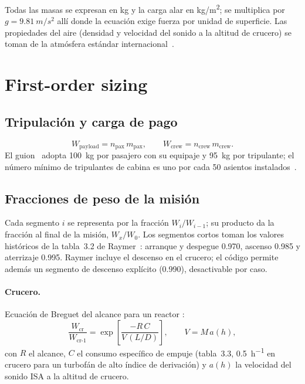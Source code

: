 \documentclass[11pt,a4paper]{article}
\newcommand{\WO}{W_0}
\begin{document}
Todas las masas se expresan en \si{kg} y la carga alar en \si{kg/m^2}; se
multiplica por $g=\SI{9.81}{m/s^2}$ allí donde la ecuación exige fuerza por
unidad de superficie. Las propiedades del aire (densidad y velocidad del
sonido a la altitud de crucero) se toman de la atmósfera estándar
internacional~\cite{isa}.

\section{First-order sizing}

\subsection{Tripulación y carga de pago}
\begin{equation}
  W_\text{payload} = n_\text{pax}\, m_\text{pax}, \qquad
  W_\text{crew} = n_\text{crew}\, m_\text{crew}.
\end{equation}
El guion~\cite{guion} adopta \SI{100}{kg} por pasajero con su equipaje y
\SI{95}{kg} por tripulante; el número mínimo de tripulantes de cabina es uno
por cada 50 asientos instalados~\cite{airops}.

\subsection{Fracciones de peso de la misión}
Cada segmento $i$ se representa por la fracción $W_i/W_{i-1}$; su producto da
la fracción al final de la misión, $W_x/\WO$. Los segmentos cortos toman los
valores históricos de la tabla~3.2 de Raymer~\cite{raymer6}: arranque y
despegue \num{0.970}, ascenso \num{0.985} y aterrizaje \num{0.995}. Raymer
incluye el descenso en el crucero; el código permite además un segmento de
descenso explícito (\num{0.990}), desactivable por caso.

\paragraph{Crucero.} Ecuación de Breguet del alcance para un reactor
\cite[ec.~3.6]{raymer6}:
\begin{equation}
  \frac{W_\text{cr}}{W_\text{cr-1}} = \exp\!\left[\frac{-R\,C}{V\,(L/D)}\right],
  \qquad V = M\,a(h),
\end{equation}
con $R$ el alcance, $C$ el consumo específico de empuje (tabla~3.3,
\SI{0.5}{h^{-1}} en crucero para un turbofán de alto índice de derivación) y
$a(h)$ la velocidad del sonido ISA a la altitud de crucero.
\end{document}
